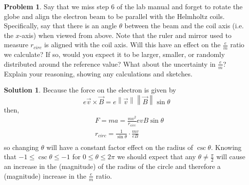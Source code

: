\documentclass[10pt]{article}
\theoremstyle{definition}
\newtheorem{problem}{Problem}
\newtheorem{soln}{Solution}
\begin{document}
\begin{problem}
  Say that we miss step 6 of the lab manual and forget to rotate the globe and align the electron beam to be parallel with the Helmholtz coils. 
  Specifically, say that there is an angle $\theta$ between the beam and the coil axis (i.e. the $x$-axis) when viewed from above.
  Note that the ruler and mirror used to measure $r_{circ}$ is aligned with the coil axis. Will this have an effect on the $\frac{e}{m}$ ratio we calculate? 
  If so, would you expect it to be larger, smaller, or randomly distributed around the reference value? What about the uncertainty in $\frac{e}{m}$? 
  Explain your reasoning, showing any calculations and sketches.
\end{problem}
\begin{soln}
Because the force on the electron is given by 
$$e\vec{v}\times \vec{B}=e\left\lVert \vec{v}\right\rVert\left\lVert \vec{B}\right\rVert\sin\theta$$
then,
\begin{align*}
  &F=ma=\frac{mv^2}{r_{circ}}evB\sin\theta\\
  &r_{circ}=\frac{1}{\sin\theta}\cdot\frac{mv}{eB}\\
\end{align*}
so changing $\theta$ will have a constant factor effect on the radius of $\csc\theta$. Knowing that $-1\leq\csc\theta\leq-1$ for $0\leq\theta\leq2\pi$ 
we should expect that any $\theta\neq\frac{\pi}{2}$ will cause an increase in the (magnitude) of the radius of the circle and therefore a (magnitude) increase in the $\frac{e}{m}$ ratio.
\end{soln}
\end{document}
